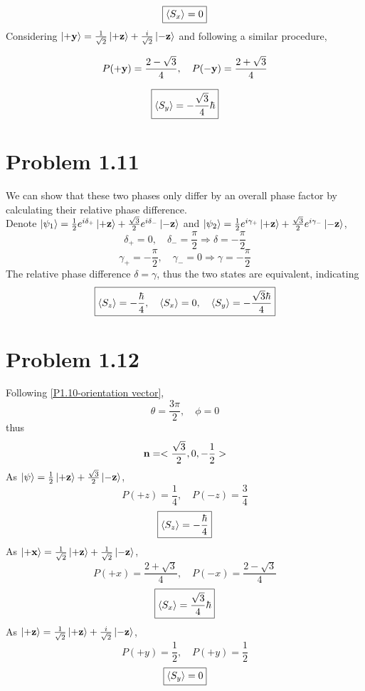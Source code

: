 \documentclass{article}
\begin{document}
\begin{equation*}
    \boxed{
    \expval{S_x}=0}
\end{equation*}
Considering $\ket{\vb{+y}} = \frac{1}{\sqrt{2}} \ket{\vb{+z}} + \frac{i}{\sqrt{2}} \ket{\vb{-z}}$ and following a similar procedure,

\begin{equation*}
    P(\vb{+y}) = \frac{2-\sqrt{3}}{4}, \quad
    P(\vb{-y}) = \frac{2+\sqrt{3}}{4}
\end{equation*}

\begin{equation*}
    \boxed{
    \expval{S_y} =-\frac{\sqrt{3}}{4} \hbar}
\end{equation*}

\section*{Problem 1.11}
We can show that these two phases only differ by an overall phase factor by calculating their relative phase difference.\\
Denote $\ket{\psi_1}=\frac{1}{2}e^{i\delta_+ }\ket{\vb{+z}}+\frac{\sqrt{3}}{2}e^{i\delta_-}\ket{\vb{-z}}$ and $\ket{\psi_2}=\frac{1}{2}e^{i\gamma_+ }\ket{\vb{+z}}+\frac{\sqrt{3}}{2}e^{i\gamma_-}\ket{\vb{-z}}$,
\[
    \delta_+ = 0, \quad \delta_- = \frac{\pi}{2}
    \Rightarrow \delta = -\frac{\pi}{2}  
\]
\[
    \gamma_+ = -\frac{\pi}{2}, \quad \gamma_- = 0
    \Rightarrow \gamma = -\frac{\pi}{2}
\]
The relative phase difference $\delta=\gamma$, thus the two states are equivalent, indicating
\begin{equation*}
    \boxed{
        \expval{S_z} = -\frac{\hbar}{4}, \quad
        \expval{S_x} = 0, \quad
        \expval{S_y} = -\frac{\sqrt{3}\hbar}{4}
    }
\end{equation*}
\section*{Problem 1.12}
Following \eqref{P1.10-orientation vector},
\[
    \theta= \frac{3\pi}{2}, \quad
    \phi = 0
\]
thus
\[
    \vb{n}=
    <\frac{\sqrt{3}}{2},0,-\frac{1}{2}>
\]
As $\ket{\psi}=\frac{1}{2}\ket{\vb{+z}} + \frac{\sqrt{3}}{2} \ket{\vb{-z}}$,
\[
    P(+z) = \frac{1}{4}, \quad P(-z) = \frac{3}{4}
\] 
\[
    \boxed{
    \expval{S_z} = -\frac{\hbar}{4}}
\]
As $\ket{\vb{+x}} = \frac{1}{\sqrt{2}} \ket{\vb{+z}} + \frac{1}{\sqrt{2}} \ket{\vb{-z}} $,
\[
    P(+x) = \frac{2+\sqrt{3}}{4}, \quad
    P(-x) = \frac{2-\sqrt{3}}{4}
\]
\[
    \boxed{
    \expval{S_x} = \frac{\sqrt{3}}{4}\hbar}
\]
As $\ket{\vb{+z}} = \frac{1}{\sqrt{2}} \ket{\vb{+z}} + \frac{i}{\sqrt{2}} \ket{\vb{-z}} $,
\[
    P(+y) = \frac{1}{2}, \quad
    P(+y) = \frac{1}{2}
\]
\[
    \boxed{
        \expval{S_y} = 0
    }
\]
\end{document}
